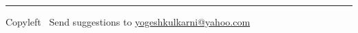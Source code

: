 
\graphicspath{{./images/}}

\makeatletter
\makeatother



	
\newpage 

\footnotesize

\begin{multicols}{2}
	
\end{multicols}

\rule{\linewidth}{0.25pt}
\scriptsize
Copyleft \textcopyleft\  Send suggestions to 
\href{http://www.yogeshkulkarni.com}{yogeshkulkarni@yahoo.com}


